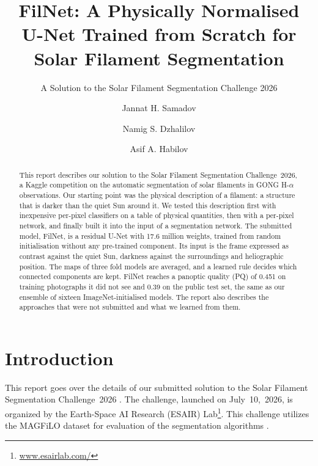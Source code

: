 \documentclass[sigconf]{acmart}
\newcommand{\nfolds}{three}          %
\newcommand{\oofpq}{0.451}           %
\begin{document}
\title[FilNet for Solar Filament Segmentation]{FilNet: A Physically Normalised U-Net Trained from Scratch for Solar Filament Segmentation}
\subtitle{A Solution to the Solar Filament Segmentation Challenge 2026} %


\author{Jannat H. Samadov}

\author{Namig S. Dzhalilov}

\author{Asif A. Habilov}

\begin{abstract}
    This report describes our solution to the Solar Filament Segmentation Challenge~2026, a Kaggle competition on the automatic segmentation of solar filaments in GONG H-$\alpha$ observations. Our starting point was the physical description of a filament: a structure that is darker than the quiet Sun around it. We tested this description first with inexpensive per-pixel classifiers on a table of physical quantities, then with a per-pixel network, and finally built it into the input of a segmentation network. The submitted model, FilNet, is a residual U-Net with 17.6 million weights, trained from random initialisation without any pre-trained component. Its input is the frame expressed as contrast against the quiet Sun, darkness against the surroundings and heliographic position. The maps of \nfolds{} fold models are averaged, and a learned rule decides which connected components are kept. FilNet reaches a panoptic quality (PQ) of \oofpq{} on training photographs it did not see and 0.39 on the public test set, the same as our ensemble of sixteen ImageNet-initialised models. The report also describes the approaches that were not submitted and what we learned from them.
\end{abstract}

\maketitle


\section{Introduction}
    This report goes over the details of our submitted solution to the Solar Filament Segmentation Challenge~2026 \cite{filament-segmentation-2026}. The challenge, launched on July~10,~2026, is organized by the Earth-Space AI Research (ESAIR) Lab\footnote{\href{https://www.esairlab.com/home}{www.esairlab.com/}}. This challenge utilizes the MAGFiLO dataset for evaluation of the segmentation algorithms \cite{ahmadzadeh2024dataset}.
\end{document}
